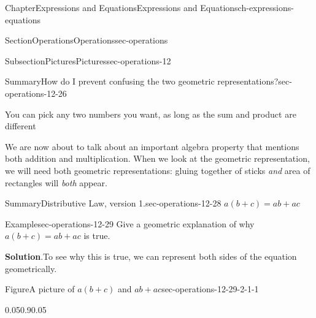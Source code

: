 \documentclass[twoside,11pt,]{book}
\newcommand{\blocktitlefont}{\relax}
\numberwithin{equation}{chapter}
\begin{document}
\begin{chapterptx}{Chapter}{Expressions and Equations}{}{Expressions and Equations}{}{}{ch-expressions-equations}
\begin{sectionptx}{Section}{Operations}{}{Operations}{}{}{sec-operations}
\begin{subsectionptx}{Subsection}{Pictures}{}{Pictures}{}{}{sec-operations-12}
\begin{assemblage}{Summary}{How do I prevent confusing the two geometric representations?}{sec-operations-12-26}
\begin{enumerate}
\end{enumerate}
You can pick any two numbers you want, as long as the sum and product are different%
\end{assemblage}
We are now about to talk about an important algebra property that mentions both addition and multiplication. When we look at the geometric representation, we will need both geometric representations: gluing together of sticks \emph{and} area of rectangles will \emph{both} appear.%
\begin{assemblage}{Summary}{Distributive Law, version 1.}{sec-operations-12-28}%
\(a(b+c)=ab+ac\)%
\end{assemblage}
\begin{example}{Example}{}{sec-operations-12-29}%
Give a geometric explanation of why \(a(b+c)=ab+ac\) is true.%
\par\smallskip%
\noindent\textbf{\blocktitlefont Solution}.\hypertarget{sec-operations-12-29-2}{}\quad{}To see why this is true, we can represent both sides of the equation geometrically. \begin{figureptx}{Figure}{A picture of \(a(b+c)\) and \(ab+ac\)}{sec-operations-12-29-2-1-1}{}%
\begin{image}{0.05}{0.9}{0.05}{}%
\end{image}
\end{figureptx}
\end{example}
\end{subsectionptx}
\end{sectionptx}
\end{chapterptx}
\end{document}

